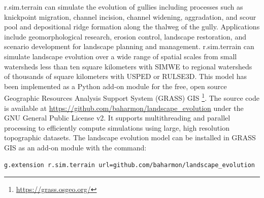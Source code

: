 \documentclass[esurf, manuscript]{copernicus}
\begin{document}
\lowercase{r.sim.terrain}
can simulate the evolution of gullies
including processes such as 
knickpoint migration,
channel incision, 
channel widening, 
aggradation, and
scour pool and 
depositional ridge formation
along the thalweg of the gully. 
Applications include 
geomorphological research,
erosion control, 
landscape restoration, 
and scenario development 
for landscape planning and management.
r.sim.terrain can simulate landscape evolution 
over a wide range of spatial scales from small watersheds 
less than ten square kilometers
with SIMWE
to regional watersheds
of thousands of square kilometers
with USPED or RULSE3D. 
%
This model has been implemented 
as a Python add-on module 
for the free, open source
Geographic Resources Analysis Support System (GRASS) GIS
\footnote{\url{https://grass.osgeo.org/}}. 
The source code is available at 
\url{https://github.com/baharmon/landscape\_evolution} 
under the GNU General Public License v2. %
It supports multithreading and parallel processing
to efficiently compute simulations 
using large, high resolution topographic datasets.
%
The landscape evolution model 
can be installed in GRASS GIS as an add-on module 
with the command: 
\begin{lstlisting}
g.extension r.sim.terrain url=github.com/baharmon/landscape_evolution
\end{lstlisting}




\end{document}
